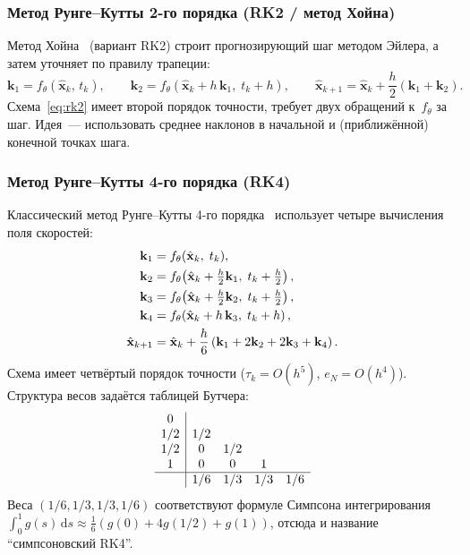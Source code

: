 \subsubsection{Метод Рунге--Кутты 2-го порядка (RK2 / метод Хойна)}

Метод Хойна~\cite{Runge1895} (вариант RK2) строит прогнозирующий шаг методом Эйлера, а затем уточняет по правилу трапеции:
\begin{equation}
    \mathbf{k}_1 = f_\theta(\hat{\mathbf{x}}_k,\, t_k), \qquad
    \mathbf{k}_2 = f_\theta(\hat{\mathbf{x}}_k + h\,\mathbf{k}_1,\; t_k + h), \qquad
    \hat{\mathbf{x}}_{k+1} = \hat{\mathbf{x}}_k + \frac{h}{2}(\mathbf{k}_1 + \mathbf{k}_2).
    \label{eq:rk2}
\end{equation}
Схема~\eqref{eq:rk2} имеет второй порядок точности, требует двух обращений к~$f_\theta$ за шаг. Идея~--- использовать среднее наклонов в начальной и (приближённой) конечной точках шага.

\subsubsection{Метод Рунге--Кутты 4-го порядка (RK4)}

Классический метод Рунге--Кутты 4-го порядка~\cite{kutta1901beitrag} использует четыре вычисления поля скоростей:
\begin{align}
    \mathbf{k}_1 &= f_\theta(\hat{\mathbf{x}}_k,\; t_k), \notag\\
    \mathbf{k}_2 &= f_\theta\!\left(\hat{\mathbf{x}}_k + \tfrac{h}{2}\mathbf{k}_1,\; t_k + \tfrac{h}{2}\right), \notag\\
    \mathbf{k}_3 &= f_\theta\!\left(\hat{\mathbf{x}}_k + \tfrac{h}{2}\mathbf{k}_2,\; t_k + \tfrac{h}{2}\right), \notag\\
    \mathbf{k}_4 &= f_\theta\!\left(\hat{\mathbf{x}}_k + h\,\mathbf{k}_3,\; t_k + h\right), \notag\\
    \hat{\mathbf{x}}_{k+1} &= \hat{\mathbf{x}}_k + \frac{h}{6}\left(\mathbf{k}_1 + 2\mathbf{k}_2 + 2\mathbf{k}_3 + \mathbf{k}_4\right).
    \label{eq:rk4}
\end{align}
Схема имеет четвёртый порядок точности ($\tau_k = O(h^5)$, $e_N = O(h^4)$). Структура весов задаётся таблицей Бутчера:
\[
\begin{array}{c|cccc}
0 & & & & \\
1/2 & 1/2 & & & \\
1/2 & 0 & 1/2 & & \\
1 & 0 & 0 & 1 & \\
\hline
& 1/6 & 1/3 & 1/3 & 1/6
\end{array}
\]
Веса $(1/6, 1/3, 1/3, 1/6)$ соответствуют формуле Симпсона интегрирования $\int_0^1 g(s)\,\mathrm{d}s\approx \tfrac{1}{6}(g(0)+4g(1/2)+g(1))$, отсюда и название ``симпсоновский RK4''.

